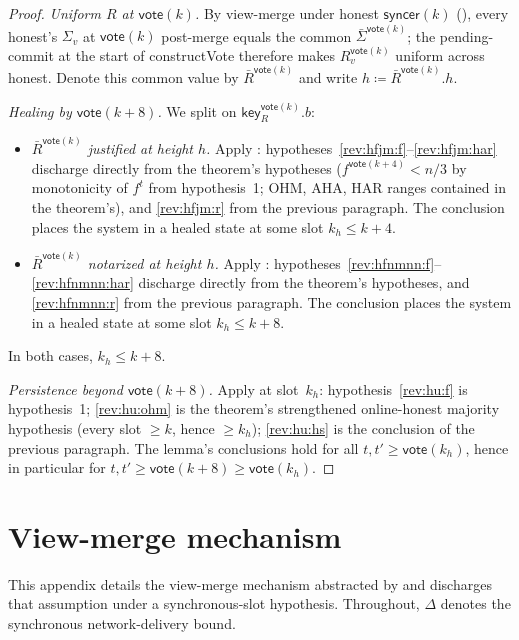\documentclass{article}
\newcommand{\key}{\mathsf{key}}
\newcommand{\syncer}{\mathsf{syncer}}
\newcommand{\vote}{\mathsf{vote}}
\newcommand{\comm}[1]{\bar{#1}}
\newcommand{\constructVote}{\textsf{constructVote}\xspace}
\theoremstyle{plain}
\theoremstyle{definition}
\theoremstyle{remark}
\newcommand{\OHM}{online-honest majority\xspace}
\begin{document}
\begin{proof}
\emph{Uniform $R$ at $\vote(k)$.}
By view-merge under honest $\syncer(k)$ (), every honest's $\Sigma_v$ at $\vote(k)$ post-merge equals the common $\comm{\Sigma}^{\vote(k)}$; the pending-commit at the start of \constructVote{} therefore makes $R_v^{\vote(k)}$ uniform across honest. Denote this common value by $\comm{R}^{\vote(k)}$ and write $h \coloneqq \comm{R}^{\vote(k)}.h$.

\emph{Healing by $\vote(k+8)$.}
We split on $\key_R^{\vote(k)}.b$:
\begin{itemize}
  \item \emph{$\comm{R}^{\vote(k)}$ justified at height $h$.} Apply : hypotheses~\ref{rev:hfjm:f}--\ref{rev:hfjm:har} discharge directly from the theorem's hypotheses ($f^{\vote(k+4)} < n/3$ by monotonicity of $f^t$ from hypothesis~1; OHM, AHA, HAR ranges contained in the theorem's), and \ref{rev:hfjm:r} from the previous paragraph. The conclusion places the system in a healed state at some slot $k_h \leq k+4$.
  \item \emph{$\comm{R}^{\vote(k)}$ notarized at height $h$.} Apply : hypotheses~\ref{rev:hfnmnn:f}--\ref{rev:hfnmnn:har} discharge directly from the theorem's hypotheses, and \ref{rev:hfnmnn:r} from the previous paragraph. The conclusion places the system in a healed state at some slot $k_h \leq k+8$.
\end{itemize}
In both cases, $k_h \leq k+8$.

\emph{Persistence beyond $\vote(k+8)$.}
Apply  at slot~$k_h$: hypothesis~\ref{rev:hu:f} is hypothesis~1; \ref{rev:hu:ohm} is the theorem's strengthened \OHM hypothesis (every slot $\geq k$, hence $\geq k_h$); \ref{rev:hu:hs} is the conclusion of the previous paragraph. The lemma's conclusions hold for all $t, t' \geq \vote(k_h)$, hence in particular for $t, t' \geq \vote(k+8) \geq \vote(k_h)$.
\end{proof}

\appendix

\section{View-merge mechanism}\label{app:view-merge}

This appendix details the view-merge mechanism abstracted by  and discharges that assumption under a synchronous-slot hypothesis.
Throughout, $\Delta$ denotes the synchronous network-delivery bound.
\end{document}
